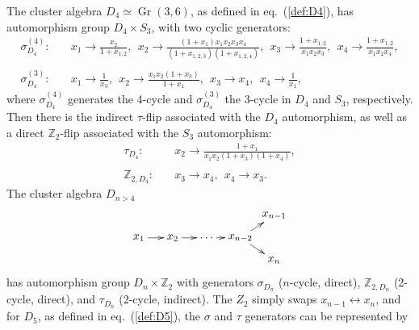 \documentclass[11pt]{article}
\DeclareMathOperator{\Gr}{Gr}
\begin{document}
The cluster algebra $D_4 \simeq \Gr(3,6)$, as defined in eq.~(\ref{def:D4}), has automorphism group $D_4\times S_3$, with two cyclic generators: 
\begin{equation}
\begin{split}
  \sigma^{(4)}_{D_4}:\quad& 
    x_1\to\frac{x_2}{1+x_{1,2}},~~  
    x_2\to\frac{\left(1+x_1\right)x_1 x_2 x_3 x_4}{\left(1+x_{1,2,3}\right) \left(1+x_{1,2,4}\right)},~~
    x_3\to\frac{1+x_{1,2}}{x_1 x_2 x_3},~~
    x_4\to\frac{1+x_{1,2}}{x_1 x_2 x_4},\\ \\
  \sigma^{(3)}_{D_4}:\quad& 
    x_1\to \frac{1}{x_3},~~
    x_2\to \frac{x_1 x_2 \left(1+x_3\right)}{1+x_1},~~
    x_3\to x_4,~~
    x_4\to \frac{1}{x_1},
\end{split}  
\end{equation}
where $\sigma^{(4)}_{D_4}$ generates the 4-cycle and $\sigma^{(3)}_{D_4}$ the 3-cycle in $D_4$ and $S_3$, respectively. Then there is the indirect $\tau$-flip associated with the $D_4$ automorphism, as well as a direct $\mathbb{Z}_2$-flip associated with the $S_3$ automorphism:
\begin{equation}
\begin{split}
  \tau_{D_4}:\quad& 
    x_2\to \frac{1+x_1}{x_1 x_2 \left(1+x_3\right) \left(1+x_4\right)},\\ \\
  \mathbb{Z}_{2,D_4}:\quad& 
    x_3\to x_4,~~
    x_4\to x_3.
\end{split}  
\end{equation}
The cluster algebra $D_{n>4}$
\begin{equation}
    \begin{gathered}
    \begin{xy} 0;<1pt,0pt>:<0pt,-1pt>::
      (0,20) *+{x_1} ="1",
      (30,20) *+{x_2} ="2",
      (60,20) *+{\ldots} ="3",
      (90,20) *+{x_{n-2}} ="4",
      (120,0) *+{x_{n-1}} ="5",
      (120,40) *+{x_{n}} ="6",
      "1", {\ar"2"},
      "2", {\ar"3"},
      "3", {\ar"4"},
      "4", {\ar"5"},
      "4", {\ar"6"},
    \end{xy}
    \end{gathered}
\end{equation}
has automorphism group $D_n \times \mathbb{Z}_2$ with generators $\sigma_{D_n}$ ($n$-cycle, direct), $\mathbb{Z}_{2,D_n}$ (2-cycle, direct), and $\tau_{D_n}$ (2-cycle, indirect). The $Z_2$ simply swaps $x_{n-1} \leftrightarrow x_n$, and for $D_5$, as defined in eq.~(\ref{def:D5}), the $\sigma$ and $\tau$ generators can be represented by
\end{document}
